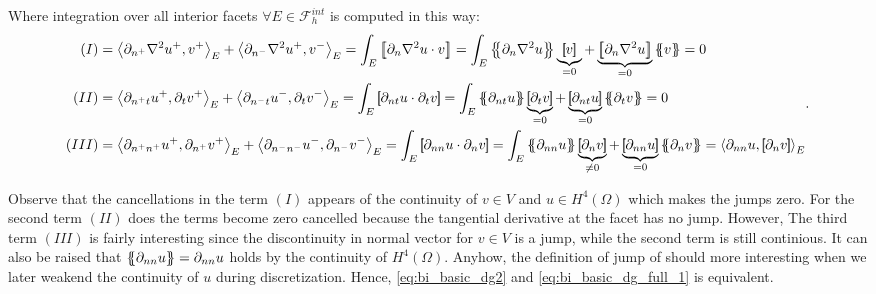 Where integration over all interior facets $ \forall E \in \mathcal{F}_{h}^{int}$ is computed in this way:
\begin{equation*}
    \begin{split}
        (I) &  =    \left<\partial _{n^{+}} \nabla ^2 u^{+} ,v^{+}\right>_{E} +
        \left<\partial _{n^{-}} \nabla ^2 u^{+} ,v^{-}\right>_{E} =   \int_{E}^{}
        \jump{ \partial _{n} \nabla ^2 u \cdot v } =
         \int_{E}^{}
         \mean{ \partial _{n} \nabla ^2 u } \underbrace{\jump{ v }}_{= 0}    + \underbrace{\jump{ \partial _{n} \nabla ^2 u
         }}_{= 0}    \mean{ v } = 0 \\
        (II) &  =     \left<\partial _{n^{+}t} u^{+}, \partial_{t} v^{+}
        \right>_{E} +  \left<\partial _{n^{-}t} u^{-}, \partial_{t} v^{-}
\right>_{E}    =   \int_{E}^{}
        \jump{ \partial _{nt} u \cdot  \partial_{t} v } =
         \int_{E}^{}
         \mean{ \partial _{nt} u    } \underbrace{\jump{ \partial_{t} v }  }_{= 0}    + \underbrace{\jump{ \partial
                 _{nt}  u
         }}_{= 0}    \mean{ \partial _{t}v }  = 0\\
        (III) &  =     \left<\partial _{n^{+}n^{+}} u^{+}, \partial_{n^{+}} v^{+} \right>_{E} +  \left<\partial _{n^{-}n^{-}} u^{-}, \partial_{n^{-}} v^{-} \right>_{E}    =    \int_{E}^{} \jump{ \partial _{nn} u \cdot  \partial_{n} v } = \int_{E}^{}
        \mean{ \partial _{nn} u    } \underbrace{\jump{ \partial_{n} v }  }_{\neq 0}    + \underbrace{\jump{ \partial
                 _{nn}  u
         }}_{= 0}    \mean{ \partial _{n}v } =
        \left< \partial _{nn} u    , \jump{ \partial_{n} v } \right>_{E}  \\
    \end{split}
.\end{equation*}

Observe that the cancellations in the term $(I)$ appears of the continuity of $v\in V $ and $u\in H^{4}\left( \Omega  \right) $ which makes the jumps zero. For the second term $(II)$ does the terms become zero cancelled because the tangential
derivative at the facet
has no jump. However, The third term $(III)$  is fairly interesting since the discontinuity in normal vector for $v \in V$ is a jump, while the second term is still continious. It can also be raised that $\left\{\!\!\left\{ \partial _{nn} u \right\}\!\!\right\} = \partial _{nn} u  $ holds by the continuity of $H^{4}\left( \Omega  \right) $. Anyhow, the definition of jump of should more interesting when we later weakend the continuity of $u$ during discretization.
Hence, \eqref{eq:bi_basic_dg2} and \eqref{eq:bi_basic_dg_full_1} is equivalent.


